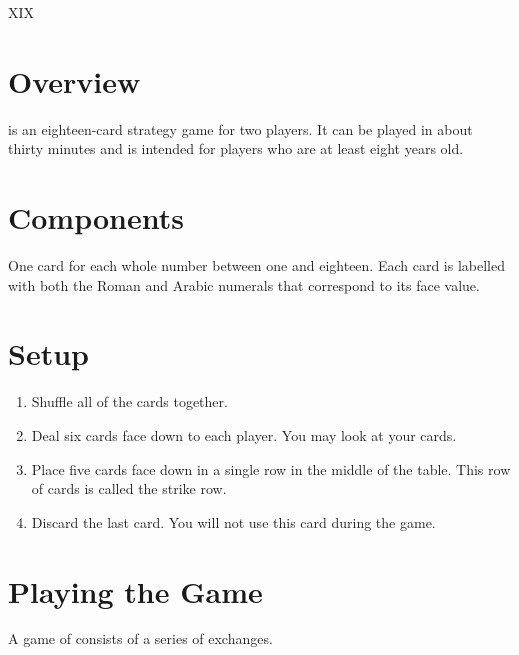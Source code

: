 \documentclass[a6paper, parskip=half, DIV=14, 10pt]{scrartcl}
\newcommand{\textRN}[1]{{\setmainfont{Roboto Slab} \RomanNumeral{#1}}}
\begin{document}
{%
\setmainfont[Scale=5.0]{Roboto Slab}
\Huge
\phantom{a}
\vfill{}
\begin{center}
XIX
\vfill
\phantom{a}
\end{center}
}%
\newpage
\setmainfont{Roboto}%
\raggedright%
\section*{Overview}
\textRN{19} is an eighteen-card strategy game for two players. It can be played in about thirty minutes and is intended for players who are at least eight years old.

\section*{Components}
\begin{description}[leftmargin=0pt, labelsep=\widthof{\ }]
	\item[Numbered Cards (18) \textendash] One card for each whole number between one and eighteen. Each card is labelled with both the Roman and Arabic numerals that correspond to its face value.
\end{description}

\section*{Setup}
\begin{enumerate}[leftmargin=*]
	\item Shuffle all of the cards together. 
	\item Deal six cards face down to each player. You may look at your cards.
	\item Place five cards face down in a single row in the middle of the table. This row of cards is called the strike row.
	\item Discard the last card. You will not use this card during the game.
\end{enumerate}

\newpage

\section*{Playing the Game}
A game of \textRN{19} consists of a series of exchanges.
\end{document}
